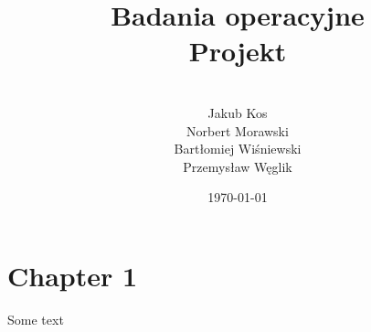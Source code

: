 \documentclass[12pt,a4paper,openright]{mwrep}
\begin{document}
\title{
Badania operacyjne\\
Projekt\\
}

\author{\\Jakub Kos\\Norbert Morawski
\\Bartłomiej Wiśniewski\\Przemysław Węglik}

\date{\today}

\maketitle

\chapter{Chapter 1}

Some text
\end{document}
